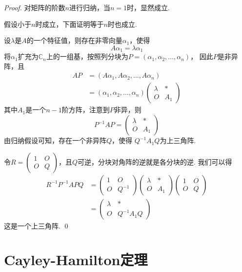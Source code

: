 \begin{proof}
	对矩阵的阶数$n$进行归纳，当$n=1$时，显然成立.

	假设小于$n$时成立，下面证明等于$n$时也成立.

	设$\lambda$是$A$的一个特征值，则存在非零向量$\alpha_1$，使得
	$$
		A \alpha_1 = \lambda \alpha_1
	$$
	将$\alpha_1$扩充为$\mathbb{C}_n$上的一组基，按照列分块为$P=(\alpha_1, \alpha_2, \dots, \alpha_n)$，
	因此$P$是非异阵，且
	\begin{align*}
		AP &= (A\alpha_1, A\alpha_2, \dots, A\alpha_n) \\
			& = (\alpha_1, \alpha_2, \dots, \alpha_n) \begin{pmatrix}
				\lambda & \ast  \\
				O & A_1
			\end{pmatrix}
	\end{align*}
	其中$A_1$是一个$n-1$阶方阵，注意到$P$非异，则
	$$
		P^{-1} A P = \begin{pmatrix}
			\lambda & \ast  \\
			O & A_1
		\end{pmatrix}
	$$
	由归纳假设可知，存在一个非异阵$Q$，使得
	$
		Q^{-1}A_1 Q
	$为上三角阵.
	
	令$R=\begin{pmatrix}
		1 & O \\
		O & Q
	\end{pmatrix}$，且$Q$可逆，分块对角阵的逆就是各分块的逆. 我们可以得
	\begin{align*}
		R^{-1}P^{-1} A P Q &= \begin{pmatrix}
			1 & O \\
			O & Q^{-1}
		\end{pmatrix} 
		\begin{pmatrix}
			\lambda & \ast  \\
			O & A_1
		\end{pmatrix}
		\begin{pmatrix}
			1 & O \\
			O & Q
		\end{pmatrix} \\
		&= \begin{pmatrix}
			\lambda & \ast \\
			O & Q^{-1}A_1 Q
		\end{pmatrix}
	\end{align*}
	这是一个上三角阵. \qed
\end{proof}

\section{Cayley-Hamilton定理}

